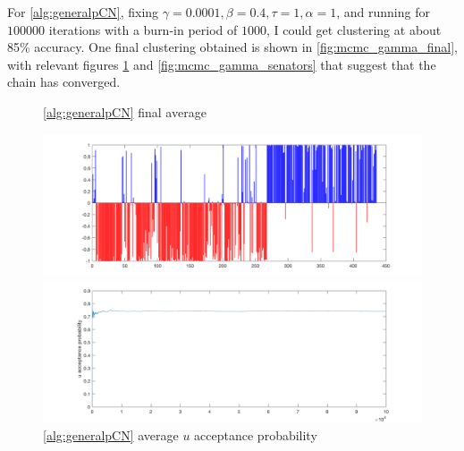 \documentclass{siamart1116}
\begin{document}
For \cref{alg:generalpCN}, fixing $\gamma = 0.0001, \beta = 0.4, \tau = 1, \alpha = 1$, and running for $100000$ iterations with a burn-in period of $1000$, I could get clustering at about 85\% accuracy. One final clustering obtained is shown in \cref{fig:mcmc_gamma_final}, with relevant figures \cref{fig:mcmc_gamma_acceptance} and \cref{fig:mcmc_gamma_senators} that suggest that the chain has converged.
\begin{figure}[!htb]
\begin{minipage}{0.48\textwidth}
    \caption{\label{fig:mcmc_gamma_final} \cref{alg:generalpCN} final average}
    \includegraphics[width = \linewidth]{voting/mcmc_gamma/final_avg.png}
\end{minipage}\hfill
\begin{minipage}{0.48\textwidth}
    \caption{\label{fig:mcmc_gamma_acceptance} \cref{alg:generalpCN} average $u$ acceptance probability}
    \includegraphics[width=\linewidth]{voting/mcmc_gamma/u_accept.png}
\end{minipage}
\end{figure}
\end{document}
